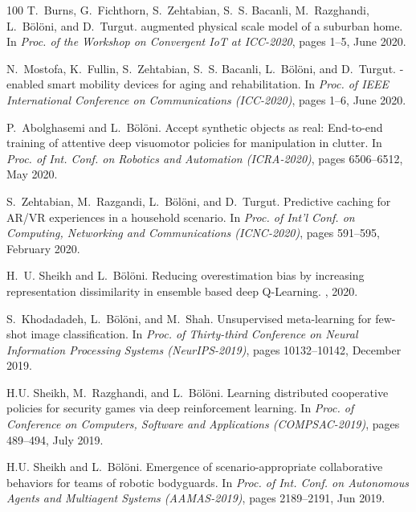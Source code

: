 \begin{thebibliography}{100}
T.~Burns, G.~Fichthorn, S.~Zehtabian, S.~S. Bacanli, M.~Razghandi, L.~Bölöni,
  and D.~Turgut.
 augmented physical scale model of a suburban home.
\newblock In {\em Proc. of the Workshop on Convergent IoT at ICC-2020}, pages
  1--5, June 2020.

N.~Mostofa, K.~Fullin, S.~Zehtabian, S.~S. Bacanli, L.~Bölöni, and D.~Turgut.
-enabled smart mobility devices for aging and rehabilitation.
\newblock In {\em Proc. of IEEE International Conference on Communications
  (ICC-2020)}, pages 1--6, June 2020.

P.~Abolghasemi and L.~Bölöni.
\newblock Accept synthetic objects as real: End-to-end training of attentive
  deep visuomotor policies for manipulation in clutter.
\newblock In {\em Proc. of Int. Conf. on Robotics and Automation (ICRA-2020)},
  pages 6506--6512, May 2020.

S.~Zehtabian, M.~Razgandi, L.~Bölöni, and D.~Turgut.
\newblock Predictive caching for {AR/VR} experiences in a household scenario.
\newblock In {\em Proc. of Int'l Conf. on Computing, Networking and
  Communications (ICNC-2020)}, pages 591--595, February 2020.

H.~U. Sheikh and L.~B{\"o}l{\"o}ni.
\newblock Reducing overestimation bias by increasing representation
  dissimilarity in ensemble based deep {Q-Learning}.
, 2020.

S.~Khodadadeh, L.~Bölöni, and M.~Shah.
\newblock Unsupervised meta-learning for few-shot image classification.
\newblock In {\em Proc. of Thirty-third Conference on Neural Information
  Processing Systems (NeurIPS-2019)}, pages 10132--10142, December 2019.

H.U. Sheikh, M.~Razghandi, and L.~Bölöni.
\newblock Learning distributed cooperative policies for security games via deep
  reinforcement learning.
\newblock In {\em Proc. of Conference on Computers, Software and Applications
  (COMPSAC-2019)}, pages 489--494, July 2019.

H.U. Sheikh and L.~Bölöni.
\newblock Emergence of scenario-appropriate collaborative behaviors for teams
  of robotic bodyguards.
\newblock In {\em Proc. of Int. Conf. on Autonomous Agents and Multiagent
  Systems (AAMAS-2019)}, pages 2189--2191, Jun 2019.


\end{thebibliography}
